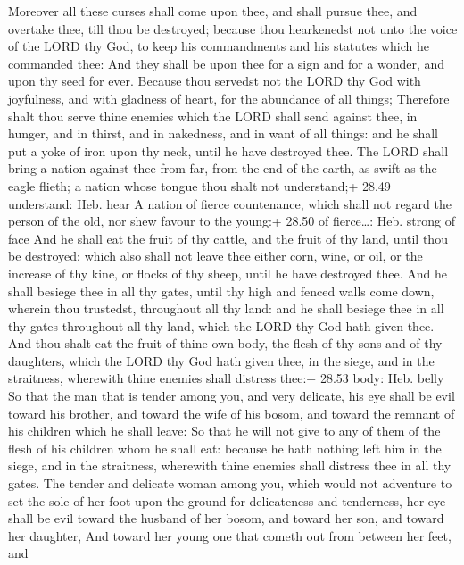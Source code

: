  Moreover all these curses shall come upon thee, and shall
pursue thee, and overtake thee, till thou be destroyed; because thou
hearkenedst not unto the voice of the LORD thy God, to keep his
commandments and his statutes which he commanded thee:  And
they shall be upon thee for a sign and for a wonder, and upon thy seed
for ever.  Because thou servedst not the LORD thy God with
joyfulness, and with gladness of heart, for the abundance of all things;
 Therefore shalt thou serve thine enemies which the LORD
shall send against thee, in hunger, and in thirst, and in nakedness, and
in want of all things: and he shall put a yoke of iron upon thy neck,
until he have destroyed thee.  The LORD shall bring a
nation against thee from far, from the end of the earth, as swift as the
eagle flieth; a nation whose tongue thou shalt not understand;+ 28.49
understand: Heb. hear  A nation of fierce countenance,
which shall not regard the person of the old, nor shew favour to the
young:+ 28.50 of fierce\ldots: Heb. strong of face  And he
shall eat the fruit of thy cattle, and the fruit of thy land, until thou
be destroyed: which also shall not leave thee either corn, wine, or oil,
or the increase of thy kine, or flocks of thy sheep, until he have
destroyed thee.  And he shall besiege thee in all thy
gates, until thy high and fenced walls come down, wherein thou
trustedst, throughout all thy land: and he shall besiege thee in all thy
gates throughout all thy land, which the LORD thy God hath given thee.
 And thou shalt eat the fruit of thine own body, the flesh
of thy sons and of thy daughters, which the LORD thy God hath given
thee, in the siege, and in the straitness, wherewith thine enemies shall
distress thee:+ 28.53 body: Heb. belly  So that the man
that is tender among you, and very delicate, his eye shall be evil
toward his brother, and toward the wife of his bosom, and toward the
remnant of his children which he shall leave:  So that he
will not give to any of them of the flesh of his children whom he shall
eat: because he hath nothing left him in the siege, and in the
straitness, wherewith thine enemies shall distress thee in all thy
gates.  The tender and delicate woman among you, which
would not adventure to set the sole of her foot upon the ground for
delicateness and tenderness, her eye shall be evil toward the husband of
her bosom, and toward her son, and toward her daughter, 
And toward her young one that cometh out from between her feet, and
